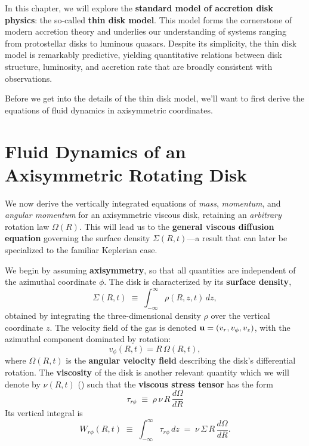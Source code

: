 
In this chapter, we will explore the \textbf{standard model of accretion disk physics}: the so-called \textbf{thin disk model}. This model forms the cornerstone of modern accretion theory and underlies our understanding of systems ranging from protostellar disks to luminous quasars. Despite its simplicity, the thin disk model is remarkably predictive, yielding quantitative relations between disk structure, luminosity, and accretion rate that are broadly consistent with observations.
\par
Before we get into the details of the thin disk model, we'll want to first derive the equations of fluid dynamics in axisymmetric coordinates.

\section{Fluid Dynamics of an Axisymmetric Rotating Disk}

We now derive the vertically integrated equations of \emph{mass}, \emph{momentum}, and \emph{angular momentum} 
for an axisymmetric viscous disk, retaining an \emph{arbitrary} rotation law $\Omega(R)$. 
This will lead us to the \textbf{general viscous diffusion equation} governing the surface density $\Sigma(R,t)$---a result 
that can later be specialized to the familiar Keplerian case.
\par
We begin by assuming \textbf{axisymmetry}, so that all quantities are independent of the azimuthal coordinate $\phi$. 
The disk is characterized by its \textbf{surface density},
\begin{equation}
\label{eq:def_surface_density}
\Sigma(R,t) \;\equiv\; \int_{-\infty}^{\infty} \rho(R,z,t)\,dz,
\end{equation}
obtained by integrating the three-dimensional density $\rho$ over the vertical coordinate $z$. 
The velocity field of the gas is denoted ${\bf u} = (v_r, v_\phi, v_z)$, with the azimuthal component dominated by rotation:
\[
v_\phi(R,t) = R\,\Omega(R,t),
\]
where $\Omega(R,t)$ is the \textbf{angular velocity field} describing the disk’s differential rotation. The \textbf{viscosity} of the disk is another relevant quantity which we will denote by $\nu(R,t)$ () such that the \textbf{viscous stress tensor} has the form
\[
\tau_{r\phi} \;\equiv\; \rho\,\nu\,R\,\frac{d\Omega}{dR}
\]
Its vertical integral is
\begin{equation}
W_{r\phi}(R,t) \;\equiv\; \int_{-\infty}^{\infty}\tau_{r\phi}\,dz
\;=\; \nu\,\Sigma\,R\,\frac{d\Omega}{dR}.
\label{eq:Wrphi_def}
\end{equation}

